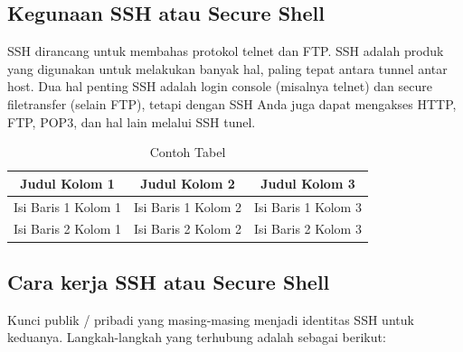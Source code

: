 \subsection {Kegunaan SSH atau Secure Shell}
SSH dirancang untuk membahas protokol telnet dan FTP. SSH adalah produk yang digunakan untuk melakukan banyak hal, paling tepat antara tunnel antar host. Dua hal penting SSH adalah login console (misalnya telnet) dan secure filetransfer (selain FTP), tetapi dengan SSH Anda juga dapat mengakses HTTP, FTP, POP3, dan hal lain melalui SSH tunel.

\begin{table}[t]
\begin{center}
\begin{tabular}{|c|c|c|}
\hline
  Judul Kolom 1 & Judul Kolom 2 & Judul Kolom 3 \\
\hline
  Isi Baris 1 Kolom 1 & Isi Baris 1 Kolom 2 & Isi Baris 1 Kolom 3 \\
  Isi Baris 2 Kolom 1 & Isi Baris 2 Kolom 2 & Isi Baris 2 Kolom 3 \\
\hline
\end{tabular}
\caption{Contoh Tabel}
\end{center}
\end{table}

\subsection {Cara kerja SSH atau Secure Shell}

Kunci publik / pribadi yang masing-masing menjadi identitas SSH untuk keduanya.
Langkah-langkah yang terhubung adalah sebagai berikut:

